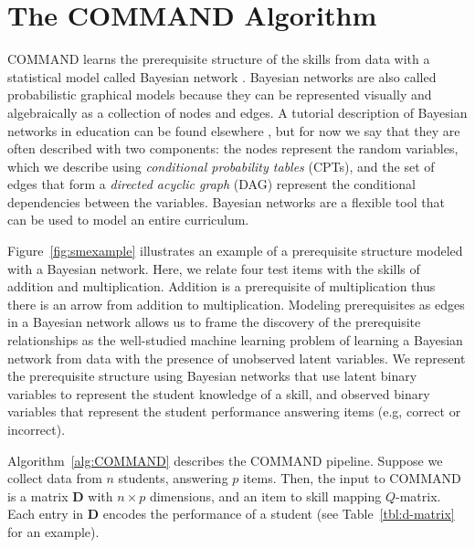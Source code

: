 \documentclass{edm_template}
\begin{document}
\section{The COMMAND Algorithm}
\label{sec:pre_pipeline}
COMMAND learns the prerequisite structure of the skills from data with a statistical model called Bayesian network \cite{pearl2000causality,spirtes2001causation}.
Bayesian networks are also called probabilistic graphical models  because they can  be represented visually and algebraically as a collection of nodes and edges.
A tutorial description of Bayesian networks in education can be found elsewhere \cite{almond2015bayesian}, 
but for now we say that they are often described with two components: 
the  nodes represent the random variables, which we describe using \textit{conditional probability tables} (CPTs),
and the set of edges that form a \textit{directed acyclic graph} (DAG) represent the conditional dependencies between the variables.
Bayesian networks are a flexible tool that can be used to model an entire curriculum.

Figure~\ref{fig:smexample} illustrates an example of a prerequisite structure modeled with a Bayesian network.
Here, we relate four test items with the skills of addition and multiplication.
Addition is a prerequisite of multiplication thus there is an arrow from addition to multiplication.
Modeling prerequisites as edges in a Bayesian network allows us to frame the discovery of the prerequisite relationships as the well-studied machine learning problem of
learning a Bayesian network from data with the presence of unobserved latent variables.
We represent the prerequisite structure using Bayesian networks that use latent binary variables to represent the student knowledge of a skill, 
and observed binary variables that represent the student performance answering items (e.g, correct or incorrect).



Algorithm~\ref{alg:COMMAND} describes the COMMAND pipeline.
Suppose we collect data from  $n$ students, answering $p$ items.
Then, the input to COMMAND is a matrix $\mathbf{D}$ with $n \times p$ dimensions, and an item to skill mapping $Q$-matrix.
Each entry in $\mathbf{D}$ encodes the performance of a student (see Table~\ref{tbl:d-matrix} for an example).
\end{document}
